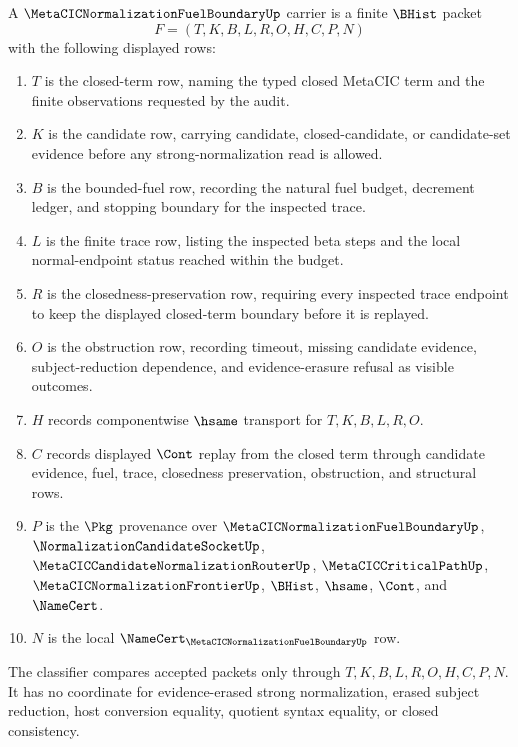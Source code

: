 \begin{definition}
\label{def:metacic-normalization-fuel-boundary-carrier}
A $\MetaCICNormalizationFuelBoundaryUp$ carrier is a finite $\BHist$ packet
$$
F=(T,K,B,L,R,O,H,C,P,N)
$$
with the following displayed rows:
\begin{enumerate}
\item $T$ is the closed-term row, naming the typed closed MetaCIC term and the finite observations requested by the audit.
\item $K$ is the candidate row, carrying candidate, closed-candidate, or candidate-set evidence before any strong-normalization read is allowed.
\item $B$ is the bounded-fuel row, recording the natural fuel budget, decrement ledger, and stopping boundary for the inspected trace.
\item $L$ is the finite trace row, listing the inspected beta steps and the local normal-endpoint status reached within the budget.
\item $R$ is the closedness-preservation row, requiring every inspected trace endpoint to keep the displayed closed-term boundary before it is replayed.
\item $O$ is the obstruction row, recording timeout, missing candidate evidence, subject-reduction dependence, and evidence-erasure refusal as visible outcomes.
\item $H$ records componentwise $\hsame$ transport for $T,K,B,L,R,O$.
\item $C$ records displayed $\Cont$ replay from the closed term through candidate evidence, fuel, trace, closedness preservation, obstruction, and structural rows.
\item $P$ is the $\Pkg$ provenance over $\MetaCICNormalizationFuelBoundaryUp$, $\NormalizationCandidateSocketUp$, $\MetaCICCandidateNormalizationRouterUp$, $\MetaCICCriticalPathUp$, $\MetaCICNormalizationFrontierUp$, $\BHist$, $\hsame$, $\Cont$, and $\NameCert$.
\item $N$ is the local $\NameCert_{\MetaCICNormalizationFuelBoundaryUp}$ row.
\end{enumerate}
The classifier compares accepted packets only through $T,K,B,L,R,O,H,C,P,N$. It has no coordinate for evidence-erased strong normalization, erased subject reduction, host conversion equality, quotient syntax equality, or closed consistency.
\end{definition}

